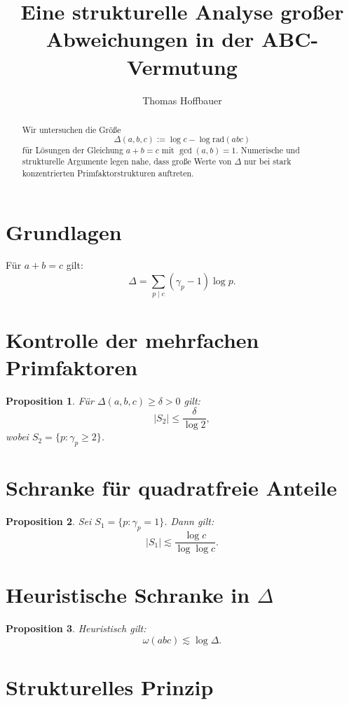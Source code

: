 \documentclass{article}
\title{Eine strukturelle Analyse großer Abweichungen in der ABC-Vermutung}
\author{Thomas Hoffbauer}
\date{}
\newtheorem{proposition}{Proposition}
\begin{document}
	\maketitle
	
	\begin{abstract}
		Wir untersuchen die Größe
		\[
		\Delta(a,b,c) := \log c - \log \mathrm{rad}(abc)
		\]
		für Lösungen der Gleichung $a+b=c$ mit $\gcd(a,b)=1$.
		Numerische und strukturelle Argumente legen nahe, dass große Werte von $\Delta$
		nur bei stark konzentrierten Primfaktorstrukturen auftreten.
	\end{abstract}
	
	\section{Grundlagen}
	
	Für $a+b=c$ gilt:
	\[
	\Delta = \sum_{p \mid c} (\gamma_p - 1)\log p.
	\]
	
	\section{Kontrolle der mehrfachen Primfaktoren}
	
	\begin{proposition}
		Für $\Delta(a,b,c) \ge \delta > 0$ gilt:
		\[
		|S_2| \le \frac{\delta}{\log 2},
		\]
		wobei $S_2 = \{p : \gamma_p \ge 2\}$.
	\end{proposition}
	
	\section{Schranke für quadratfreie Anteile}
	
	\begin{proposition}
		Sei $S_1 = \{p : \gamma_p = 1\}$. Dann gilt:
		\[
		|S_1| \lesssim \frac{\log c}{\log\log c}.
		\]
	\end{proposition}
	
	\section{Heuristische Schranke in $\Delta$}
	
	\begin{proposition}
		Heuristisch gilt:
		\[
		\omega(abc) \lesssim \log \Delta.
		\]
	\end{proposition}
	
	\section{Strukturelles Prinzip}
	
\end{document}
